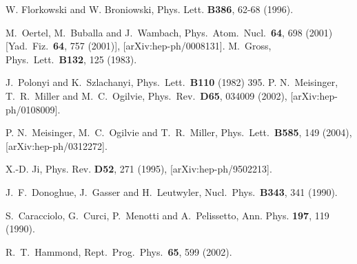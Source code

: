 \begin{thebibliography}{10}
 W. Florkowski and W. Broniowski, Phys. Lett. {\bf B386}, 62-68 (1996).

  M.~Oertel, M.~Buballa and J.~Wambach,
  Phys.\ Atom.\ Nucl.\  {\bf 64}, 698 (2001)
  [Yad.\ Fiz.\  {\bf 64}, 757 (2001)],
  [arXiv:hep-ph/0008131].
  M.~Gross,
  Phys.\ Lett.\ {\bf B132}, 125 (1983).

  J.~Polonyi and K.~Szlachanyi,
  Phys.\ Lett.\  {\bf B110} (1982) 395.
  P. N.~Meisinger, T.~R.~Miller and M.~C.~Ogilvie,
  Phys.\ Rev.\ {\bf D65}, 034009 (2002),
  [arXiv:hep-ph/0108009].

  P. N.~Meisinger, M.~C.~Ogilvie and T.~R.~Miller,
  Phys.\ Lett.\ {\bf B585}, 149 (2004),
  [arXiv:hep-ph/0312272].







X.-D. Ji,
\newblock Phys. Rev. {\bf D52}, 271 (1995), [arXiv:hep-ph/9502213].


  J.~F.~Donoghue, J.~Gasser and H.~Leutwyler,
  Nucl.\ Phys.\ {\bf B343}, 341 (1990).


S.~Caracciolo, G.~Curci, P.~Menotti and A.~Pelissetto,
\newblock Ann. Phys. {\bf 197}, 119 (1990).

  R.~T.~Hammond,
  Rept.\ Prog.\ Phys.\  {\bf 65}, 599 (2002).



\end{thebibliography}
